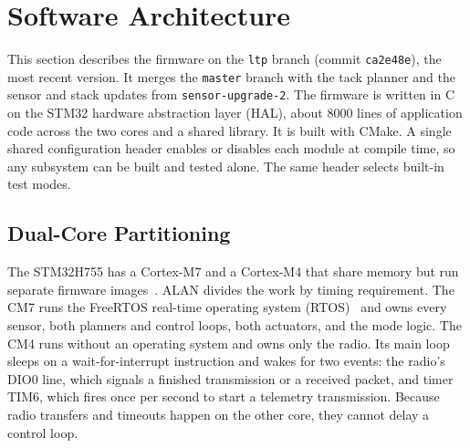 \section{Software Architecture}
\label{sec:sw}

This section describes the firmware on the \texttt{ltp} branch (commit
\texttt{ca2e48e}), the most recent version. It merges the \texttt{master}
branch with the tack planner and the sensor and stack updates from
\texttt{sensor-upgrade-2}. The firmware is written in C on the STM32 hardware
abstraction layer (HAL),
about 8000 lines of application code across the two cores and a shared
library. It is built with CMake. A single shared configuration header enables
or disables each module at compile time, so any subsystem can be built and
tested alone. The same header selects built-in test modes.

\subsection{Dual-Core Partitioning}
The STM32H755 has a Cortex-M7 and a Cortex-M4 that share memory but run
separate firmware images~\cite{rm0399}. ALAN divides the work by timing
requirement. The CM7 runs the FreeRTOS real-time operating system
(RTOS)~\cite{barry2016} and owns every sensor, both planners and control
loops, both actuators, and the mode logic. The CM4 runs without an operating
system and owns only the radio. Its main loop sleeps on a wait-for-interrupt
instruction and wakes for two events: the radio's DIO0 line, which signals a
finished transmission or a received packet, and timer TIM6, which fires once
per second to start a telemetry transmission. Because radio transfers and
timeouts happen on the other core, they cannot delay a control loop.

